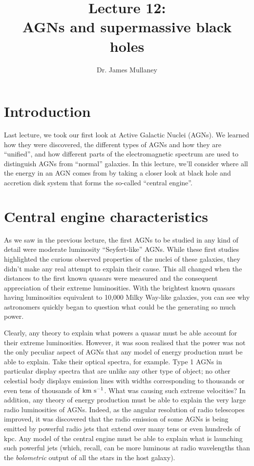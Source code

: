 \documentclass[11pt]{article}
\begin{document}
 
\title{Lecture 12:\\AGNs and supermassive black holes}
\author{Dr. James Mullaney}
\maketitle

\section{Introduction}
Last lecture, we took our first look at Active Galactic Nuclei
(AGNs). We learned how they were discovered, the different types of
AGNs and how they are ``unified'', and how different parts of the
electromagnetic spectrum are used to distinguish AGNs from ``normal''
galaxies. In this lecture, we'll consider where all the energy in an
AGN comes from by taking a closer look at black hole and accretion disk
system that forms the so-called ``central engine''.

\section{Central engine characteristics}
As we saw in the previous lecture, the first AGNs to be studied in any
kind of detail were moderate luminosity ``Seyfert-like'' AGNs. While
these first studies highlighted the curious observed properties of the
nuclei of these galaxies, they didn't make any real attempt to explain
their cause. This all changed when the distances to the first known
quasars were measured and the consequent appreciation of their extreme
luminosities. With the brightest known quasars having
luminosities equivalent to 10,000 Milky Way-like galaxies, you can see
why astronomers quickly began to question what could be the generating
so much power. 

Clearly, any theory to explain what powers a quasar must be able
account for their extreme luminosities. However, it was soon realised
that the power was not the only peculiar aspect of AGNs that any model
of energy production must be able to explain. Take their optical
spectra, for example. Type 1 AGNs in particular display spectra that
are unlike any other type of object; no other celestial body displays
emission lines with widths corresponding to thousands or even tens of
thousands of ${\rm km~s^{-1}}$. What was causing such extreme
velocities? In addition, any theory of energy production must be able
to explain the very large radio luminosities of AGNs. Indeed, as the
angular resolution of radio telescopes improved, it was discovered that
the radio emission of some AGNs is being emitted by powerful radio
jets that extend over many tens or even hundreds of kpc. Any model of
the central engine must be able to explain what is launching such
powerful jets (which, recall, can be more luminous at radio
wavelengths than the {\it bolometric} output of all the stars in the
host galaxy).
\end{document}
